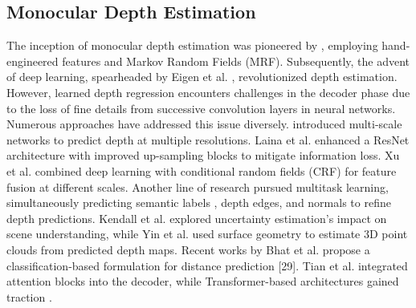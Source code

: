 \subsection{Monocular Depth Estimation}

The inception of monocular depth estimation was pioneered by \cite{saxena2005learning, saxena2008make3d}, employing hand-engineered features and Markov Random Fields (MRF). Subsequently, the advent of deep learning, spearheaded by Eigen et al. \cite{eigen2014depth}, revolutionized depth estimation. However, learned depth regression encounters challenges in the decoder phase due to the loss of fine details from successive convolution layers in neural networks. Numerous approaches have addressed this issue diversely. \cite{eigen2015predicting} introduced multi-scale networks to predict depth at multiple resolutions. Laina et al. \cite{laina2016deeper} enhanced a ResNet architecture with improved up-sampling blocks to mitigate information loss. Xu et al. \cite{xu2017multi} combined deep learning with conditional random fields (CRF) for feature fusion at different scales. Another line of research pursued multitask learning, simultaneously predicting semantic labels \cite{jiao2018look}, depth edges, and normals \cite{ramamonjisoa2019sharpnet, zhang2019pattern, lee2019big} to refine depth predictions. Kendall et al. \cite{kendall2018multi} explored uncertainty estimation's impact on scene understanding, while Yin et al. \cite{yin2019enforcing} used surface geometry to estimate 3D point clouds from predicted depth maps. Recent works by Bhat et al. propose a classification-based formulation for distance prediction [29]. Tian et al. \cite{chen2020improving} integrated attention blocks into the decoder, while Transformer-based architectures gained traction \cite{ranftl2021vision, yang2021transformer}.